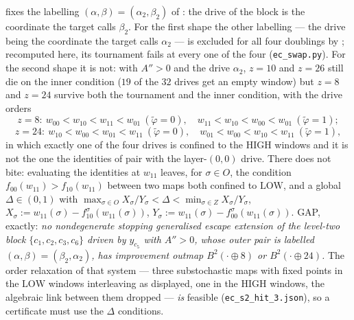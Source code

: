 \begin{remark}\label{rem:ec-scope}
 fixes the labelling $(\alpha,\beta)=(\alpha_2,\beta_2)$ of
: the drive of the block is the coordinate the target calls $\beta_2$. For
the first shape the other labelling --- the drive being the coordinate the target calls
$\alpha_2$ --- is excluded for all four doublings by ; recomputed here,
its tournament fails at every one of the four (\texttt{ec\_swap.py}). For the second shape it is
not: with $A''>0$ and the drive $\alpha_2$, $z=10$ and $z=26$ still die on the inner condition
($19$ of the $32$ drives get an empty window) but $z=8$ and $z=24$ survive both the tournament
and the inner condition, with the drive orders
\[
 z=8:\ w_{00}<w_{10}<w_{11}<w_{01}\ (\tilde\varphi=0),\quad w_{11}<w_{10}<w_{00}<w_{01}\
 (\tilde\varphi=1);
\]
\[
 z=24:\ w_{10}<w_{00}<w_{01}<w_{11}\ (\tilde\varphi=0),\quad w_{01}<w_{00}<w_{10}<w_{11}\
 (\tilde\varphi=1),
\]
in which exactly one of the four drives is confined to the $\mathrm{HIGH}$ windows and it is not
the one the identities of  pair with the layer-$(0,0)$ drive. There
\Cref{lem:ec-domination} does not bite: evaluating the identities at $w_{11}$ leaves, for
$\sigma\in O$, the condition $f_{00}(w_{11})>f_{10}(w_{11})$ between two maps both confined to
$\mathrm{LOW}$, and a global $\Delta\in(0,1)$ with
$\max_{\sigma\in O}X_\sigma/Y_\sigma<\Delta<\min_{\sigma\in Z}X_\sigma/Y_\sigma$,
$X_\sigma:=w_{11}(\sigma)-f^{\sigma}_{10}(w_{11}(\sigma))$,
$Y_\sigma:=w_{11}(\sigma)-f^{\sigma}_{00}(w_{11}(\sigma))$. GAP, exactly:
\emph{no nondegenerate stopping generalised escape extension of the level-two block
$\{c_1,c_2,c_3,c_6\}$ driven by $y_{c_5}$ with $A''>0$, whose outer pair is labelled
$(\alpha,\beta)=(\beta_2,\alpha_2)$, has improvement outmap $B^{2}(\cdot\oplus8)$ or
$B^{2}(\cdot\oplus24)$.} The order relaxation of that system --- three substochastic maps with
fixed points in the $\mathrm{LOW}$ windows interleaving as displayed, one in the $\mathrm{HIGH}$
windows, the algebraic link between them dropped --- \emph{is} feasible
(\texttt{ec\_s2\_hit\_3.json}), so a certificate must use the $\Delta$ conditions.
\end{remark}